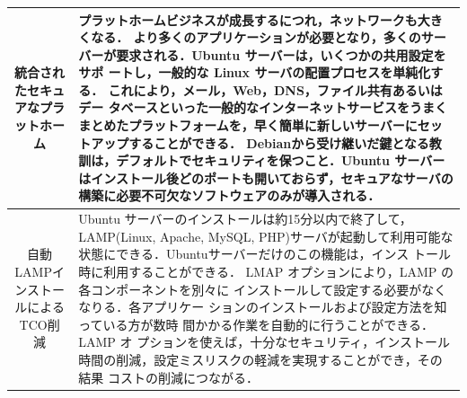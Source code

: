 \begin{tabular}{|c|p{}|}
 \hline
 統合されたセキュアなプラットホーム & プラットホームビジネスが成長するにつれ，ネットワークも大きくなる．
より多くのアプリケーションが必要となり，多くのサーバーが要求される．Ubuntu サーバーは，いくつかの共用設定をサポ ートし，一般的な Linux サーバの配置プロセスを単純化する． これにより，メール，Web，DNS，ファイル共有あるいはデー タベースといった一般的なインターネットサービスをうまくまとめたプラットフォームを，早く簡単に新しいサーバーにセットアップすることができる． Debianから受け継いだ鍵となる教訓は，デフォルトでセキュリティを保つこと．Ubuntu サーバーはインストール後どのポートも開いておらず，セキュアなサーバの構築に必要不可欠なソフトウェアのみが導入される． 
\\\hline
    自動LAMPインストー ルによるTCO削減 & Ubuntu サーバーのインストールは約15分以内で終了して， LAMP(Linux, Apache, MySQL, PHP)サーバが起動して利用可能な状態にできる．Ubuntuサーバーだけのこの機能は，インス トール時に利用することができる． LMAP オプションにより，LAMP の各コンポーネントを別々に インストールして設定する必要がなくなりる．各アプリケー
ションのインストールおよび設定方法を知っている方が数時 間かかる作業を自動的に行うことができる．LAMP オ プションを使えば，十分なセキュリティ，インストール時間の削減，設定ミスリスクの軽減を実現することができ，その結果 コストの削減につながる．\\\hline
\end{tabular}


